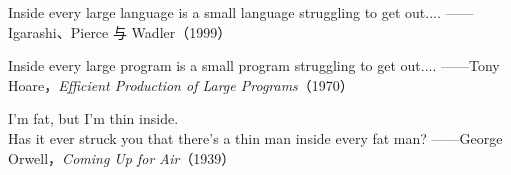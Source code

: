   {Inside every large language is a small language struggling to get out....}
  {——Igarashi、Pierce 与 Wadler（1999）}

  {Inside every large program is a small program struggling to get out....}
  {——Tony Hoare，\textit{Efficient Production of Large Programs}（1970）}

  {I'm fat, but I'm thin inside.\\
   Has it ever struck you that there's a thin man inside every fat man?}
  {——George Orwell，\textit{Coming Up for Air}（1939）}
